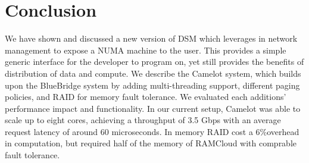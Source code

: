 \section{Conclusion}
\label{sec:conclusion}

We have shown and discussed a new version of DSM which leverages in network
management to expose a NUMA machine to the user. This provides a simple
generic interface for the developer to program on, yet still provides the
benefits of distribution of data and compute. We describe the Camelot system,
which builds upon the BlueBridge system by adding multi-threading support,
different paging policies, and RAID for memory fault tolerance. We evaluated
each additions' performance impact and functionality. In our current setup, Camelot was able to scale 
up to eight cores, achieving a throughput of 3.5 Gbps with an average request latency of around 60 
microseconds. In memory RAID cost a 6\%overhead in computation, but required half of the memory of RAMCloud with comprable fault tolerance.
